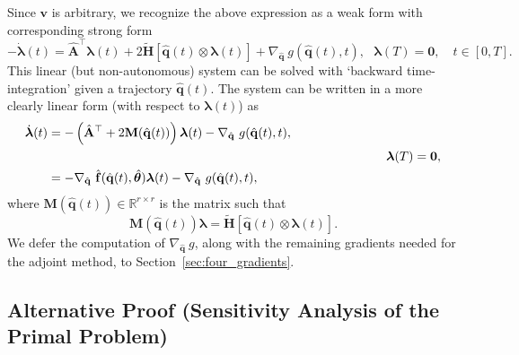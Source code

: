 Since $\mathbf{v}$ is arbitrary, we recognize the above expression as a weak form with corresponding strong form\\
\begin{equation*}
    -\dot{\bm{\lambda}}(t) = \hat{\mathbf{A}}^{\top} \bm{\lambda}(t) + 2\tilde{\mathbf{H}}[\hat{\mathbf{q}}(t)\otimes \bm{\lambda}(t)] + \nabla_{\hat{\mathbf{q}}}~g(\hat{\mathbf{q}}(t),t),~~~\bm{\lambda}(T)=\bm{0},\quad t\in [0,T].
\end{equation*}
This linear (but non-autonomous) system can be solved with `backward time-integration' given a trajectory $\hat{\mathbf{q}}(t)$. The system can be written in a more clearly linear form (with respect to $\bm{\lambda}(t)$) as\\
\begin{align}
    \label{eq:gradient_fq}
     \dot{\bm{\lambda}}(t) &= -\left(\hat{\mathbf{A}}^{\top} + 2\mathbf{M}(\hat{\mathbf{q}}(t))\right)\bm{\lambda}(t) - \nabla_{\hat{\mathbf{q}}}~g(\hat{\mathbf{q}}(t),t),\notag\\
    &~\hspace{8.8cm}~~~~~\bm{\lambda}(T)=\bm{0},\\
    &= -\nabla_{\hat{\mathbf{q}}}~\hat{\mathbf{f}}(\hat{\mathbf{q}}(t),\hat{\bm{\theta}})\bm{\lambda}(t) - \nabla_{\hat{\mathbf{q}}}~g(\hat{\mathbf{q}}(t),t)\notag,
\end{align}
where $\mathbf{M}(\hat{\mathbf{q}}(t))\in\mathbb{R}^{r\times r}$ is the matrix such that\\
\begin{equation*}
    \mathbf{M}(\hat{\mathbf{q}}(t)) \bm{\lambda} = \tilde{\mathbf{H}}[\hat{\mathbf{q}}(t)\otimes \bm{\lambda}(t)].
\end{equation*}
We defer the computation of $\nabla_{\hat{\mathbf{q}}}~g$, along with the remaining gradients needed for the adjoint method, to Section~\ref{sec:four_gradients}.




\subsection*{Alternative Proof (Sensitivity Analysis of the Primal Problem)}

